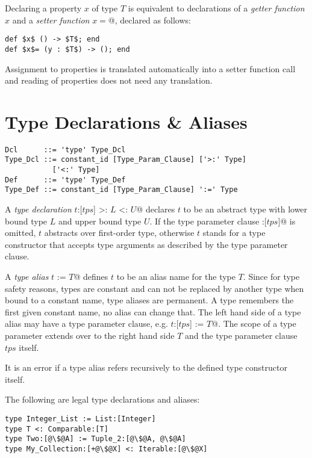 Declaring a property $x$ of type $T$ is equivalent to declarations of a {\em getter function} $x$ and a {\em setter function} \lstinline@$x=$@, declared as follows:

\begin{lstlisting}
def $x$ () -> $T$; end
def $x$= (y : $T$) -> (); end
\end{lstlisting}

Assignment to properties is translated automatically into a setter function call and reading of properties does not need any translation. 

\section{Type Declarations \& Aliases}

\syntax\begin{lstlisting}
Dcl      ::= 'type' Type_Dcl
Type_Dcl ::= constant_id [Type_Param_Clause] ['>:' Type] 
           ['<:' Type]
Def      ::= 'type' Type_Def
Type_Def ::= constant_id [Type_Param_Clause] ':=' Type
\end{lstlisting}

A {\em type declaration} \lstinline@type $t$:[$tps$] >: $L$ <: $U$@ declares $t$ to be an abstract type with lower bound type $L$ and upper bound type $U$. If the type parameter clause \lstinline@:[$tps$]@ is omitted, $t$ abstracts over first-order type, otherwise $t$ stands for a type constructor that accepts type arguments as described by the type parameter clause. 

A {\em type alias} \lstinline@type $t$ := $T$@ defines $t$ to be an alias name for the type $T$. Since for type safety reasons, types are constant and can not be replaced by another type when bound to a constant name, type aliases are permanent. A type remembers the first given constant name, no alias can change that. The left hand side of a type alias may have a type parameter clause, e.g. \lstinline@type $t$:[$tps$] := $T$@. The scope of a type parameter extends over to the right hand side $T$ and the type parameter clause $tps$ itself. 

It is an error if a type alias refers recursively to the defined type constructor itself. 

\example The following are legal type declarations and aliases:
\begin{lstlisting}[escapechar=@]
type Integer_List := List:[Integer]
type T <: Comparable:[T]
type Two:[@\$@A] := Tuple_2:[@\$@A, @\$@A]
type My_Collection:[+@\$@X] <: Iterable:[@\$@X]
\end{lstlisting}

